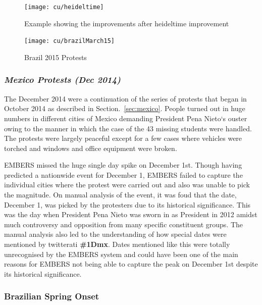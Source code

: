 \begin{figure}
\texttt{[image: cu/heideltime]}
\caption{Example showing the improvements after heideltime improvement}
\label{fig:heideltime}
\end{figure}


\begin{figure}[H]
\centering
\texttt{[image: cu/brazilMarch15]}
\caption{Brazil 2015 Protests}
\label{fig:brazilSpring}
\end{figure}

\subsubsection{\it Mexico Protests (Dec 2014)}
The December 2014 were a continuation of the series of protests that began in October 2014
as described in Section.~\ref{sec:mexico}. People turned out in huge numbers in different cities of Mexico demanding
President Pena Nieto`s ouster owing to the manner in which the case of the 43 missing students were handled.
The protests were largely peaceful except for a few cases where vehicles were torched and windows and office equipment
were broken. 

EMBERS missed the huge single day spike on December 1st. Though having predicted a nationwide event for 
December 1, EMBERS failed to capture the individual cities where the protest were carried out and also was unable
to pick the magnitude. On manual analysis of the event, it was foud that the date, December 1,  was picked by the protesters due to
its historical significance. This was the day when President Pena Nieto was sworn
in as President in 2012 amidst much controversy and opposition from
many specific constituent groups. The manual analysis also led to the understanding of how
special dates were mentioned by twitterati {\bf \#1Dmx}. Dates mentioned like this were totally unrecognised by the EMBERS
system and could have been one of the main reasons for EMBERS not being able to capture the peak on December 1st despite its
historical significance.

\subsubsection{Brazilian Spring Onset}

